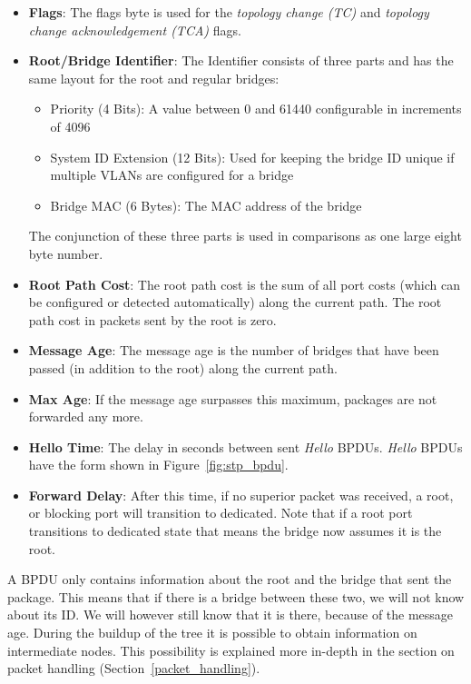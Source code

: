 \begin{itemize}
    \item \textbf{Flags}: The flags byte is used for the \textit{topology change (TC)} and \textit{topology change acknowledgement (TCA)} flags.
    \item \textbf{Root/Bridge Identifier}: The Identifier consists of three parts and has the same layout for the root and regular bridges:
        \begin{itemize}
            \item Priority (4 Bits): A value between 0 and 61440 configurable in increments of 4096
            \item System ID Extension (12 Bits): Used for keeping the bridge ID unique if multiple VLANs are configured for a bridge
            \item Bridge MAC (6 Bytes): The MAC address of the bridge
        \end{itemize}
        The conjunction of these three parts is used in comparisons as one large eight byte number.
        \item \textbf{Root Path Cost}: The root path cost is the sum of all port costs (which can be configured or detected automatically) along the current path. The root path cost in packets sent by the root is zero.
    \item \textbf{Message Age}: The message age is the number of bridges that have been passed (in addition to the root) along the current path.
    \item \textbf{Max Age}: If the message age surpasses this maximum, packages are not forwarded any more.
    \item \textbf{Hello Time}: The delay in seconds between sent \textit{Hello} BPDUs.
        \textit{Hello} BPDUs have the form shown in Figure~\ref{fig:stp_bpdu}.
    \item \textbf{Forward Delay}: After this time, if no superior packet was received, a root, or blocking port will transition to dedicated.
        Note that if a root port transitions to dedicated state that means the bridge now assumes it is the root.
\end{itemize}
A BPDU only contains information about the root and the bridge that sent the package.
This means that if there is a bridge between these two, we will not know about its ID.
We will however still know that it is there, because of the message age.
During the buildup of the tree it is possible to obtain information on intermediate nodes.
This possibility is explained more in-depth in the section on packet handling (Section~\ref{packet_handling}).

